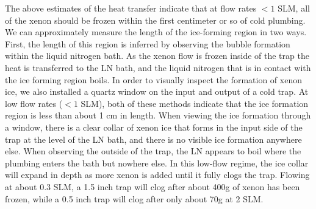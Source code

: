 \documentclass[12pt]{article}
\begin{document}
The above estimates of the heat transfer indicate that at flow rates $<1$ SLM, all of the xenon should be frozen within the first centimeter or so of cold plumbing. We can approximately measure the length of the ice-forming region in two ways. First, the length of this region is inferred by observing the bubble formation within the liquid nitrogen bath. As the xenon flow is frozen inside of the trap the heat is transferred to the LN bath, and the liquid nitrogen that is in contact with the ice forming region boils. In order to visually inspect the formation of xenon ice, we also installed a quartz window on the input and output of a cold trap. At low flow rates ($<1$ SLM), both of these methods indicate that the ice formation region is less than about 1 cm in length. When viewing the ice formation through a window, there is a clear collar of xenon ice that forms in the input side of the trap at the level of the LN bath, and there is no visible ice formation anywhere else. When observing the outside of the trap, the LN appears to boil where the plumbing enters the bath but nowhere else. In this low-flow regime, the ice collar will expand in depth as more xenon is added until it fully clogs the trap. Flowing at about 0.3 SLM, a 1.5 inch trap will clog after about 400g of xenon has been frozen, while a 0.5 inch trap will clog after only about 70g at 2 SLM.
\end{document}

